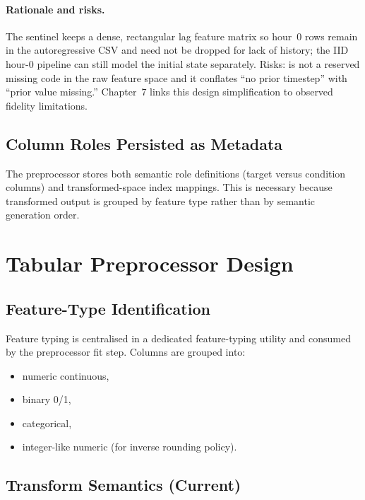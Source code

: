 \paragraph{Rationale and risks.}
The sentinel keeps a dense, rectangular lag feature matrix so hour~0 rows remain in the autoregressive CSV and need not be dropped for lack of history; the IID hour-0 pipeline can still model the initial state separately.
Risks:  is not a reserved missing code in the raw feature space and it conflates ``no prior timestep'' with ``prior value missing.'' Chapter~7 links this design simplification to observed fidelity limitations.

\subsection{Column Roles Persisted as Metadata}

The preprocessor stores both semantic role definitions (target versus condition columns) and transformed-space index mappings. This is necessary because transformed output is grouped by feature type rather than by semantic generation order.

\section{Tabular Preprocessor Design}

\subsection{Feature-Type Identification}

Feature typing is centralised in a dedicated feature-typing utility and consumed by the preprocessor fit step.
Columns are grouped into:
\begin{itemize}\tightlist
    \item numeric continuous,
    \item binary 0/1,
    \item categorical,
    \item integer-like numeric (for inverse rounding policy).
\end{itemize}

\subsection{Transform Semantics (Current)}

